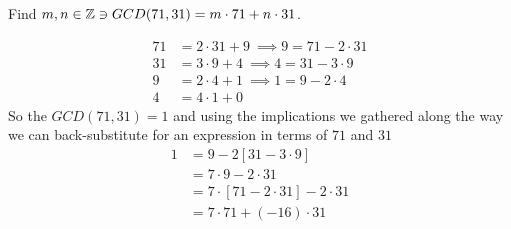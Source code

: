 \begin{example}
Find $m,n\in {\mathbb{Z}} \ni GCD(71,31)=m\cdot 71+n\cdot 31$.\steezybreak

\begin{align}
    71&= 2\cdot 31+9 \ \implies 9=71-2\cdot 31 \nonumber\\
    31&= 3\cdot 9+4 \ \implies 4=31-3\cdot 9\nonumber\\
    9&= 2\cdot 4+1 \ \implies 1=9-2\cdot 4\nonumber\\
    4&= 4\cdot 1+0 \nonumber
\end{align}
So the $GCD(71,31)=1$ and using the implications we gathered along the way we can back-substitute
for an expression in terms of $71$ and $31$
\begin{align}
    1&=9-2[31-3\cdot 9]\nonumber \\
    &=7\cdot 9- 2\cdot 31\nonumber \\
    &=7\cdot [71-2\cdot 31]- 2\cdot 31\nonumber \\
    &=7\cdot 71+ (-16)\cdot 31\nonumber
\end{align}
\end{example}

\newpage

